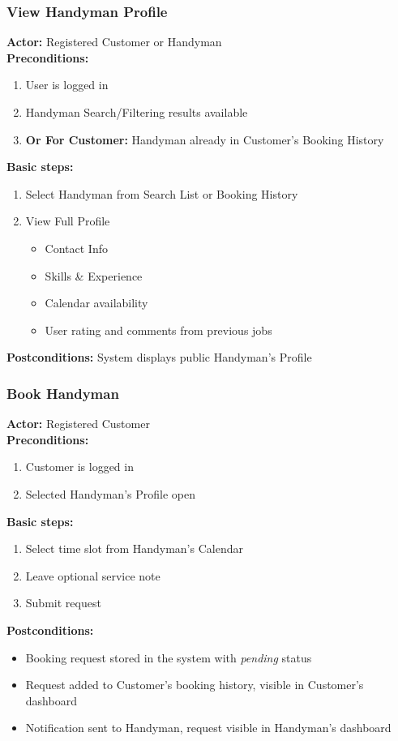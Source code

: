 \documentclass[11pt,a4paper]{article}
\begin{document}
\subsubsection{View Handyman Profile}

\textbf{Actor:} Registered Customer or Handyman \\
\textbf{Preconditions:}
\begin{enumerate}
\item User is logged in
\item Handyman Search/Filtering results available
\item \textbf{Or For Customer:} Handyman already in Customer's Booking History
\end{enumerate}

\textbf{Basic steps:}
\begin{enumerate}
\item Select Handyman from Search List or Booking History
\item View Full Profile
  \begin{itemize}
  \item Contact Info
  \item Skills & Experience
  \item Calendar availability
  \item User rating and comments from previous jobs
  \end{itemize}
\end{enumerate}
\textbf{Postconditions:} System displays public Handyman's Profile


\subsubsection{Book Handyman}

\textbf{Actor:} Registered Customer \\
\textbf{Preconditions:}
\begin{enumerate}
\item Customer is logged in
\item Selected Handyman's Profile open
\end{enumerate}

\textbf{Basic steps:}
\begin{enumerate}
\item Select time slot from Handyman's Calendar
\item Leave optional service note
\item Submit request
\end{enumerate}
\textbf{Postconditions:}
\begin{itemize}
\item Booking request stored in the system with \textit{pending} status
\item Request added to Customer's booking history, visible in Customer's dashboard
\item Notification sent to Handyman, request visible in Handyman's dashboard  
\end{itemize}
\end{document}
